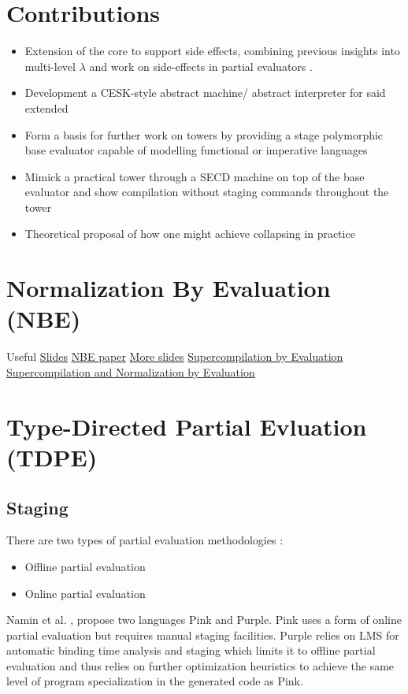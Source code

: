 \documentclass{article}
\begin{document}
\section{Contributions}
\begin{itemize}
	\item Extension of the core \mslang to support side effects, combining previous insights into multi-level $\lambda$ \cite{nielson1996multi} and work on side-effects in partial evaluators \cite{asai1997partial}.
	\item Development a CESK-style abstract machine/ abstract interpreter for said extended \mslang
	\item Form a basis for further work on towers by providing a stage polymorphic base evaluator capable of modelling functional or imperative languages
	\item Mimick a practical tower through a SECD machine on top of the base evaluator and show compilation without staging commands throughout the tower
	\item Theoretical proposal of how one might achieve collapsing in practice
\end{itemize}

\section{Normalization By Evaluation (NBE)}
Useful \href{http://cs.ioc.ee/ewscs/2009/dybjer/mainPalmse-revised.pdf}{Slides}
\href{http://www.cse.chalmers.se/~abela/univnbe.pdf}{NBE paper}
\href{http://homepages.inf.ed.ac.uk/slindley/nbe/nbe-cambridge2016.pdf}{More slides}
\href{https://www.microsoft.com/en-us/research/wp-content/uploads/2016/07/supercomp-by-eval.pdf?from=http%3A%2F%2Fresearch.microsoft.com%2Fen-us%2Fum%2Fpeople%2Fsimonpj%2Fpapers%2Fsupercompilation%2Fsupercomp-by-eval.pdf}{Supercompilation by Evaluation}
\href{http://citeseerx.ist.psu.edu/viewdoc/download?doi=10.1.1.630.2123&rep=rep1&type=pdf}{Supercompilation and Normalization by Evaluation}

\section{Type-Directed Partial Evluation (TDPE)}
\cite{grobauer2001second}

\subsection{Staging}
There are two types of partial evaluation methodologies \cite{jones1993partial}:
\begin{itemize}
	\item Offline partial evaluation
	\item Online partial evaluation \cite{cook2011tutorial}
\end{itemize}
Namin et al. \cite{amin2017collapsing}, propose two languages Pink and Purple. Pink uses a form of online partial evaluation but requires manual staging facilities. Purple relies on LMS for automatic binding time analysis and staging
which limits it to offline partial evaluation and thus relies on further optimization heuristics to achieve the same level of program specialization in the generated code as Pink.
\end{document}
